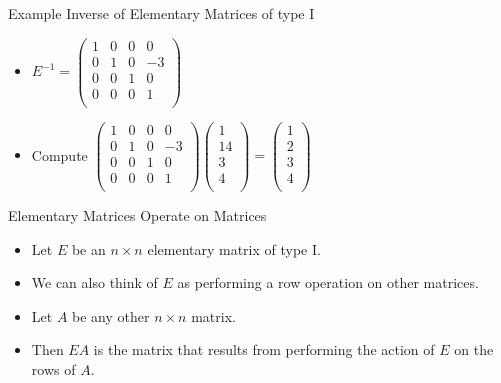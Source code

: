 \documentclass{beamer}
\begin{document}
\begin{frame}{Example Inverse of Elementary Matrices of type I}

\begin{itemize}

\item
$
E^{-1}=
\begin{pmatrix}
1 & 0 & 0 & 0 \\
0 & 1 & 0 & -3 \\
0 & 0 & 1 & 0 \\
0 & 0 & 0 & 1 \\
\end{pmatrix}
$
\item Compute
$
\begin{pmatrix}
1 & 0 & 0 & 0 \\
0 & 1 & 0 & -3 \\
0 & 0 & 1 & 0 \\
0 & 0 & 0 & 1 \\
\end{pmatrix}
\begin{pmatrix}
1  \\
14  \\
3  \\
4  \\
\end{pmatrix}
=
\begin{pmatrix}
1  \\
2  \\
3  \\
4  \\
\end{pmatrix}
$
\end{itemize}
\end{frame}

\begin{frame}{Elementary Matrices Operate on Matrices}

\begin{itemize}
\item Let $E$ be an $n\times n$ elementary matrix of type I.
\item We can also think of $E$ as performing a row operation on other matrices.
\item Let $A$ be any other $n\times n$ matrix.
\item Then $EA$ is the matrix that results from performing the action of $E$
on the rows of $A$.
\end{itemize}
\end{frame}
\end{document}
